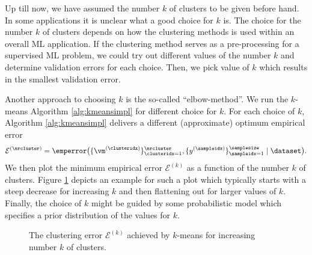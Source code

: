 \documentclass[12pt]{report}
\begin{document}
Up till now, we have assumed the number $k$ of clusters 
to be given before hand. In some applications it is unclear
what a good choice for $k$ is. The choice for the number 
$k$ of clusters depends on how the clustering methods is 
used within an overall ML application. If the clustering method 
serves as a pre-processing for a supervised ML problem, we 
could try out different values of the number $k$ and determine 
validation errors for each choice. Then, we pick value of $k$ 
which results in the smallest validation error. 

Another approach to choosing $k$ is the so-called ``elbow-method''. 
We run the $k$-means Algorithm \ref{alg:kmeansimpl} for different choice 
for $k$. For each choice of $k$, Algorithm \ref{alg:kmeansimpl} delivers a 
different (approximate) optimum empirical error $$\mathcal{E}^{(\nrcluster)} = \emperror \big( \{\vm^{(\clusteridx)}\}_{\clusteridx=1}^{\nrcluster},\{y^{(\sampleidx)}\}_{\sampleidx=1}^{\samplesize} \mid \dataset \big).$$ 
We then plot the minimum empirical error $\mathcal{E}^{(k)}$ as a 
function of the number $k$ of clusters. Figure \ref{fig_ellbow} depicts 
an example for such a plot which typically starts with a steep decrease 
for increasing $k$ and then flattening out for larger values of $k$. 
Finally, the choice of $k$ might be guided by some probabilistic 
model which specifies a prior distribution of the values for $k$. 


\begin{figure}
\begin{center}
\end{center}
\caption{The clustering error $\mathcal{E}^{(k)}$ achieved by $k$-means for increasing number $k$ of clusters.}
\label{fig_ellbow}
\end{figure}
\end{document}
